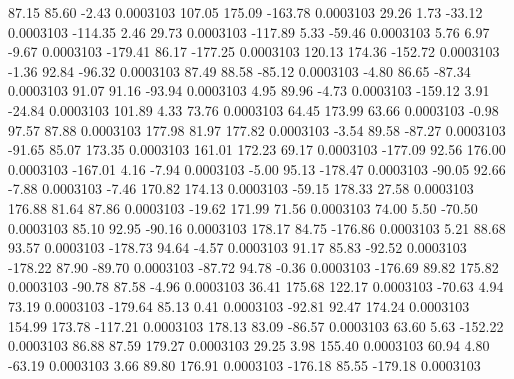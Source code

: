        87.15       85.60       -2.43     0.0003103
      107.05      175.09     -163.78     0.0003103
       29.26        1.73      -33.12     0.0003103
     -114.35        2.46       29.73     0.0003103
     -117.89        5.33      -59.46     0.0003103
        5.76        6.97       -9.67     0.0003103
     -179.41       86.17     -177.25     0.0003103
      120.13      174.36     -152.72     0.0003103
       -1.36       92.84      -96.32     0.0003103
       87.49       88.58      -85.12     0.0003103
       -4.80       86.65      -87.34     0.0003103
       91.07       91.16      -93.94     0.0003103
        4.95       89.96       -4.73     0.0003103
     -159.12        3.91      -24.84     0.0003103
      101.89        4.33       73.76     0.0003103
       64.45      173.99       63.66     0.0003103
       -0.98       97.57       87.88     0.0003103
      177.98       81.97      177.82     0.0003103
       -3.54       89.58      -87.27     0.0003103
      -91.65       85.07      173.35     0.0003103
      161.01      172.23       69.17     0.0003103
     -177.09       92.56      176.00     0.0003103
     -167.01        4.16       -7.94     0.0003103
       -5.00       95.13     -178.47     0.0003103
      -90.05       92.66       -7.88     0.0003103
       -7.46      170.82      174.13     0.0003103
      -59.15      178.33       27.58     0.0003103
      176.88       81.64       87.86     0.0003103
      -19.62      171.99       71.56     0.0003103
       74.00        5.50      -70.50     0.0003103
       85.10       92.95      -90.16     0.0003103
      178.17       84.75     -176.86     0.0003103
        5.21       88.68       93.57     0.0003103
     -178.73       94.64       -4.57     0.0003103
       91.17       85.83      -92.52     0.0003103
     -178.22       87.90      -89.70     0.0003103
      -87.72       94.78       -0.36     0.0003103
     -176.69       89.82      175.82     0.0003103
      -90.78       87.58       -4.96     0.0003103
       36.41      175.68      122.17     0.0003103
      -70.63        4.94       73.19     0.0003103
     -179.64       85.13        0.41     0.0003103
      -92.81       92.47      174.24     0.0003103
      154.99      173.78     -117.21     0.0003103
      178.13       83.09      -86.57     0.0003103
       63.60        5.63     -152.22     0.0003103
       86.88       87.59      179.27     0.0003103
       29.25        3.98      155.40     0.0003103
       60.94        4.80      -63.19     0.0003103
        3.66       89.80      176.91     0.0003103
     -176.18       85.55     -179.18     0.0003103
